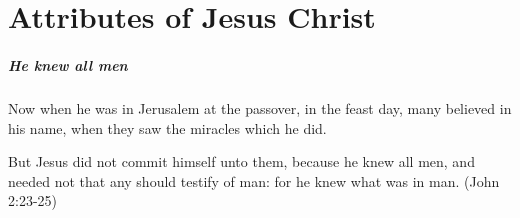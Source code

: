 \chapter{Attributes of Jesus Christ}

\paragraph{He knew all men}
Now when he was in Jerusalem at the passover, in the feast day, many believed in his name, when they saw the miracles which he did.

But Jesus did not commit himself unto them, because he knew all men, and needed not that any should testify of man: for he knew what was in man. (John 2:23-25)

